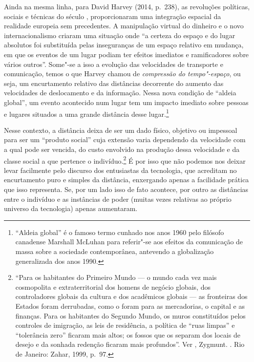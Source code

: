 Ainda na mesma linha, para David Harvey (2014, p.~238), as revoluções políticas,
sociais e técnicas do século , proporcionaram uma integração espacial
da realidade europeia sem precedentes. A manipulação virtual do dinheiro
e o novo internacionalismo criaram uma situação onde ``a certeza do
espaço e do lugar absolutos foi substituída pelas inseguranças de um
espaço relativo em mudança, em que os eventos de um lugar podiam ter
efeitos imediatos e ramificadores sobre vários outros''.
Some"-se a isso a evolução das velocidades de transporte e comunicação,
temos o que Harvey chamou de \emph{compressão do tempo"-espaço}, ou seja,
um encurtamento relativo das distâncias decorrente do aumento das
velocidades de deslocamento e da informação. Nessa nova condição de
``aldeia global'', um evento acontecido num lugar tem um impacto
imediato sobre pessoas e lugares situados a uma grande distância desse
lugar.\footnote{``Aldeia global'' é o famoso termo cunhado nos anos 1960
  pelo filósofo canadense Marshall
  McLuhan para referir"-se aos efeitos da comunicação de massa sobre a
  sociedade contemporânea, antevendo a globalização generalizada dos
  anos 1990.}

Nesse contexto, a distância deixa de ser um dado físico, objetivo ou
impessoal para ser um ``produto social'' cuja extensão varia dependendo
da velocidade com a qual pode ser vencida, do custo envolvido na
produção dessa velocidade e da classe social a que pertence o
indivíduo.\footnote{``Para os habitantes do Primeiro Mundo --- o mundo
  cada vez mais cosmopolita e extraterritorial dos homens de negócio
  globais, dos controladores globais da cultura e dos acadêmicos globais
  --- as fronteiras dos Estados foram derrubadas, como o foram para as
  mercadorias, o capital e as finanças. Para os habitantes do Segundo
  Mundo, os muros constituídos pelos controles de imigração, as leis de
  residência, a política de ``ruas limpas'' e ``tolerância zero''
  ficaram mais altos; os fossos que os separam dos locais de desejo e da
  sonhada redenção ficaram mais profundos''. Ver ,
  Zygmunt. {}. Rio de
  Janeiro: Zahar, 1999, p.~97.} É por isso que não podemos nos deixar
levar facilmente pelo discurso dos entusiastas da tecnologia, que
acreditam no encurtamento puro e simples da distância, enxergando apenas
a facilidade prática que isso representa. Se, por um lado isso de fato
acontece, por outro as distâncias entre o indivíduo e as instâncias de
poder (muitas vezes relativas ao próprio universo da tecnologia) apenas
aumentaram.

